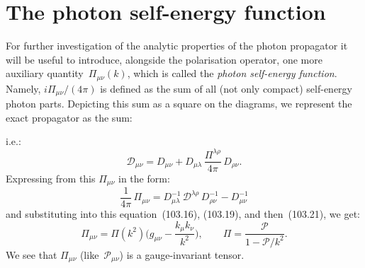 
\section{The photon self-energy function}


For further investigation of the analytic properties of the photon propagator it will be useful to introduce, alongside the polarisation operator, one more auxiliary quantity~$\Pi_{\mu\nu}(k)$, which is called the \emph{photon self-energy function}. Namely, $i\Pi_{\mu\nu}/(4\pi)$ is defined as the sum of all (not only compact) self-energy photon parts. Depicting this sum as a square on the diagrams, we represent the exact propagator as the sum:


\noindent i.e.:
\begin{equation}
\mathcal{D}_{\mu\nu} = D_{\mu\nu} + D_{\mu\lambda}\,\frac{\Pi^{\lambda\rho}}{4\pi}\,D_{\rho\nu}.
\label{eq:104.1}
\end{equation}
Expressing from this $\Pi_{\mu\nu}$ in the form:
\[
\frac{1}{4\pi}\,\Pi_{\mu\nu} = D^{-1}_{\mu\lambda}\,\mathcal{D}^{\lambda\rho}\,D^{-1}_{\rho\nu} - D^{-1}_{\mu\nu}
\]
and substituting into this equation~(103.16), (103.19), and then~(103.21), we get:
\begin{equation}
\Pi_{\mu\nu} = \Pi(k^2)\biggl(g_{\mu\nu} - \frac{k_\mu k_\nu}{k^2}\biggr), \qquad \Pi = \frac{\mathcal{P}}{1 - \mathcal{P}/k^2}.
\label{eq:104.2}
\end{equation}
We see that $\Pi_{\mu\nu}$ (like~$\mathcal{P}_{\mu\nu}$) is a gauge-invariant tensor.


